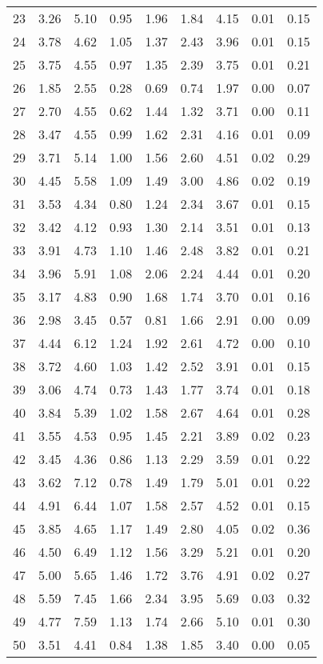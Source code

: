 \begin{table}
\begin{tabular}{lrrrrrrrr}
23 & 3.26 & 5.10 & 0.95 & 1.96 & 1.84 & 4.15 & 0.01 & 0.15 \\
24 & 3.78 & 4.62 & 1.05 & 1.37 & 2.43 & 3.96 & 0.01 & 0.15 \\
25 & 3.75 & 4.55 & 0.97 & 1.35 & 2.39 & 3.75 & 0.01 & 0.21 \\
26 & 1.85 & 2.55 & 0.28 & 0.69 & 0.74 & 1.97 & 0.00 & 0.07 \\
27 & 2.70 & 4.55 & 0.62 & 1.44 & 1.32 & 3.71 & 0.00 & 0.11 \\
28 & 3.47 & 4.55 & 0.99 & 1.62 & 2.31 & 4.16 & 0.01 & 0.09 \\
29 & 3.71 & 5.14 & 1.00 & 1.56 & 2.60 & 4.51 & 0.02 & 0.29 \\
30 & 4.45 & 5.58 & 1.09 & 1.49 & 3.00 & 4.86 & 0.02 & 0.19 \\
31 & 3.53 & 4.34 & 0.80 & 1.24 & 2.34 & 3.67 & 0.01 & 0.15 \\
32 & 3.42 & 4.12 & 0.93 & 1.30 & 2.14 & 3.51 & 0.01 & 0.13 \\
33 & 3.91 & 4.73 & 1.10 & 1.46 & 2.48 & 3.82 & 0.01 & 0.21 \\
34 & 3.96 & 5.91 & 1.08 & 2.06 & 2.24 & 4.44 & 0.01 & 0.20 \\
35 & 3.17 & 4.83 & 0.90 & 1.68 & 1.74 & 3.70 & 0.01 & 0.16 \\
36 & 2.98 & 3.45 & 0.57 & 0.81 & 1.66 & 2.91 & 0.00 & 0.09 \\
37 & 4.44 & 6.12 & 1.24 & 1.92 & 2.61 & 4.72 & 0.00 & 0.10 \\
38 & 3.72 & 4.60 & 1.03 & 1.42 & 2.52 & 3.91 & 0.01 & 0.15 \\
39 & 3.06 & 4.74 & 0.73 & 1.43 & 1.77 & 3.74 & 0.01 & 0.18 \\
40 & 3.84 & 5.39 & 1.02 & 1.58 & 2.67 & 4.64 & 0.01 & 0.28 \\
41 & 3.55 & 4.53 & 0.95 & 1.45 & 2.21 & 3.89 & 0.02 & 0.23 \\
42 & 3.45 & 4.36 & 0.86 & 1.13 & 2.29 & 3.59 & 0.01 & 0.22 \\
43 & 3.62 & 7.12 & 0.78 & 1.49 & 1.79 & 5.01 & 0.01 & 0.22 \\
44 & 4.91 & 6.44 & 1.07 & 1.58 & 2.57 & 4.52 & 0.01 & 0.15 \\
45 & 3.85 & 4.65 & 1.17 & 1.49 & 2.80 & 4.05 & 0.02 & 0.36 \\
46 & 4.50 & 6.49 & 1.12 & 1.56 & 3.29 & 5.21 & 0.01 & 0.20 \\
47 & 5.00 & 5.65 & 1.46 & 1.72 & 3.76 & 4.91 & 0.02 & 0.27 \\
48 & 5.59 & 7.45 & 1.66 & 2.34 & 3.95 & 5.69 & 0.03 & 0.32 \\
49 & 4.77 & 7.59 & 1.13 & 1.74 & 2.66 & 5.10 & 0.01 & 0.30 \\
50 & 3.51 & 4.41 & 0.84 & 1.38 & 1.85 & 3.40 & 0.00 & 0.05 \\
\bottomrule
\end{tabular}
\end{table}
